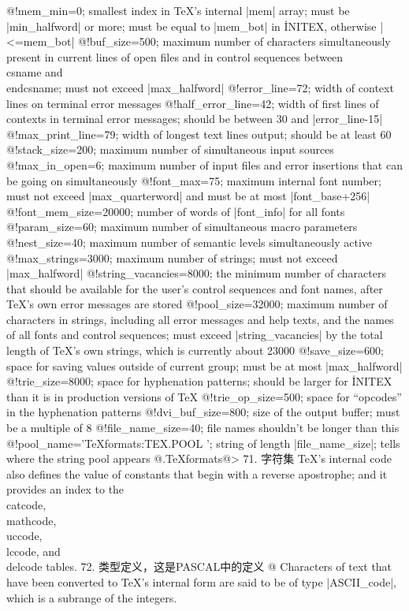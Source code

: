     @!mem_min=0; {smallest index in \TeX's internal |mem| array;
      must be |min_halfword| or more;
      must be equal to |mem_bot| in \.{INITEX}, otherwise |<=mem_bot|}
    @!buf_size=500; {maximum number of characters simultaneously present in
      current lines of open files and in control sequences between
      \.{\\csname} and \.{\\endcsname}; must not exceed |max_halfword|}
    @!error_line=72; {width of context lines on terminal error messages}
    @!half_error_line=42; {width of first lines of contexts in terminal
      error messages; should be between 30 and |error_line-15|}
    @!max_print_line=79; {width of longest text lines output; should be at least 60}
    @!stack_size=200; {maximum number of simultaneous input sources}
    @!max_in_open=6; {maximum number of input files and error insertions that
      can be going on simultaneously}
    @!font_max=75; {maximum internal font number; must not exceed |max_quarterword|
      and must be at most |font_base+256|}
    @!font_mem_size=20000; {number of words of |font_info| for all fonts}
    @!param_size=60; {maximum number of simultaneous macro parameters}
    @!nest_size=40; {maximum number of semantic levels simultaneously active}
    @!max_strings=3000; {maximum number of strings; must not exceed |max_halfword|}
    @!string_vacancies=8000; {the minimum number of characters that should be
      available for the user's control sequences and font names,
      after \TeX's own error messages are stored}
    @!pool_size=32000; {maximum number of characters in strings, including all
      error messages and help texts, and the names of all fonts and
      control sequences; must exceed |string_vacancies| by the total
      length of \TeX's own strings, which is currently about 23000}
    @!save_size=600; {space for saving values outside of current group; must be
      at most |max_halfword|}
    @!trie_size=8000; {space for hyphenation patterns; should be larger for
      \.{INITEX} than it is in production versions of \TeX}
    @!trie_op_size=500; {space for ``opcodes'' in the hyphenation patterns}
    @!dvi_buf_size=800; {size of the output buffer; must be a multiple of 8}
    @!file_name_size=40; {file names shouldn't be longer than this}
    @!pool_name='TeXformats:TEX.POOL                     ';
      {string of length |file_name_size|; tells where the string pool appears}
    @.TeXformats@>
71. 字符集
    \TeX's internal code also defines the value of constants
    that begin with a reverse apostrophe; and it provides an index to the
    \.{\\catcode}, \.{\\mathcode}, \.{\\uccode}, \.{\\lccode}, and \.{\\delcode}
    tables.
72. 类型定义，这是PASCAL中的定义
    @ Characters of text that have been converted to \TeX's internal form
    are said to be of type |ASCII_code|, which is a subrange of the integers.
    
